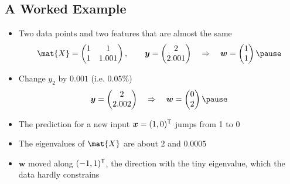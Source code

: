 \begin{slide}
\section[-1]{A Worked Example}

\begin{PauseHighLight}
  \begin{itemize}\squeeze
  \item Two data points and two features that are almost the same
    \begin{displaymath}
      \mat{X} =
      \begin{pmatrix}
        1 & 1 \\ 1 & 1.001
      \end{pmatrix},
      \qquad
      \bm{y} = \begin{pmatrix} 2 \\ 2.001 \end{pmatrix}
      \quad\Rightarrow\quad
      \bm{w} = \begin{pmatrix} 1 \\ 1 \end{pmatrix}\pause
    \end{displaymath}
  \item Change $y_2$ by $0.001$ (i.e.{} $0.05\%$)
    \begin{displaymath}
      \bm{y} = \begin{pmatrix} 2 \\ 2.002 \end{pmatrix}
      \quad\Rightarrow\quad
      \bm{w} = \begin{pmatrix} 0 \\ 2 \end{pmatrix}\pause
    \end{displaymath}
  \item The prediction for a new input $\bm{x}=(1,0)^{\textsf{T}}$ jumps from 1 to 0\pause
  \item The eigenvalues of $\mat{X}$ are about $2$ and $0.0005$\pause
  \item $\bm{w}$ moved along $(-1,1)^{\textsf{T}}$, the direction with the tiny
    eigenvalue, which the data hardly constrains\pause
  \end{itemize}
\end{PauseHighLight}
\end{slide}


